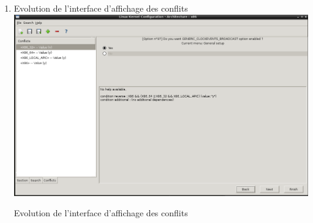 \documentclass[16pts]{report}
\begin{document}
\begin{enumerate}
	\item Evolution de l'interface d'affichage des conflits
	\\
	\includegraphics[scale=0.5]{illustrations/screen_options_conflits_interface.png}
	\centering
	\caption{Evolution de l'interface d'affichage des conflits}
	\label{fig:Evo_config}


\end{enumerate}
\end{document}
